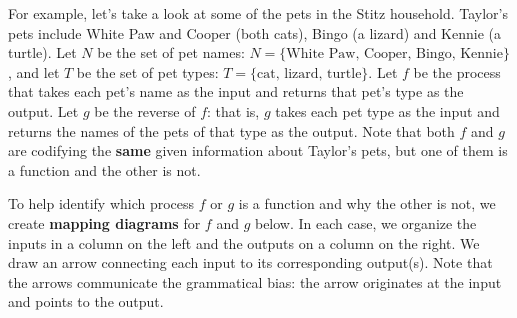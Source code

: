 \documentclass{ximera}
\begin{document}
For example, let's take a look at some of the pets in the Stitz household.  Taylor's pets include White Paw and Cooper (both cats), Bingo (a lizard) and Kennie (a turtle).  Let $N$ be the set of pet names: $N = \{ \text{White Paw, Cooper, Bingo, Kennie} \}$, and let $T$ be the set of pet types:  $T = \{ \text{cat, lizard, turtle} \}$.   Let $f$ be the process that takes each pet's name as the input and returns that pet's type as the output. Let $g$ be the reverse of $f$:  that is, $g$ takes each pet type as the input and returns the names of the pets of that type as the output.   Note that both $f$ and $g$ are codifying the \textbf{same} given information about Taylor's pets,  but one of them is a function and the other is not.  

To help identify which process $f$ or $g$ is a function and  why the other is not, we create   \textbf{mapping diagrams} for $f$ and $g$ below.  In each case, we organize the inputs in a column on the left and the outputs on a column on the right.  We draw an arrow connecting each input to its corresponding output(s).  Note that the arrows communicate the grammatical bias: the arrow originates at the input and points to the output.







\end{document}
